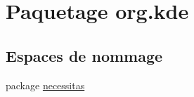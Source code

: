 \hypertarget{namespaceorg_1_1kde}{\section{Paquetage org.\-kde}
\label{namespaceorg_1_1kde}
}
\subsection*{Espaces de nommage}
\begin{DoxyCompactItemize}
\item 
package \hyperlink{namespaceorg_1_1kde_1_1necessitas}{necessitas}
\end{DoxyCompactItemize}
